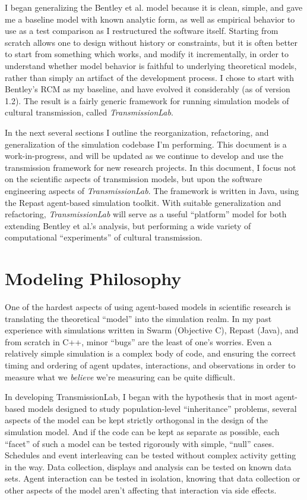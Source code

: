 \documentclass{kluwer-mem-copyright}
\begin{document}
\begin{article}
I began generalizing the Bentley et al. model because it is clean,
simple, and gave me a baseline model with known analytic form, as well as empirical behavior to use as a test comparison as I restructured the software itself.   Starting from scratch allows
one to design without history or constraints, but it is often better to start
from something which works, and modify it incrementally, in order to understand whether model behavior is faithful to underlying theoretical models, rather than simply an artifact of the development process.  I chose to start with Bentley's RCM as my baseline, and have evolved it considerably (as of version 1.2).  The result is a fairly generic framework for running 
simulation models of cultural transmission, called \emph{TransmissionLab}.  

In the next several sections I outline the reorganization, refactoring, and
generalization of the simulation codebase I'm performing.  This document is a work-in-progress, and will be updated as we continue to develop and use the transmission framework for new research projects.  In this document, I focus not on the scientific aspects of transmission models, but upon the software engineering
aspects of \emph{TransmissionLab}.  The framework is written in Java, using the Repast agent-based simulation toolkit.  With suitable generalization and refactoring, \emph{TransmissionLab} will serve as a useful ``platform'' model
for both extending Bentley et al.'s analysis, but performing a wide variety of computational ``experiments'' of cultural transmission. 
 
\section{Modeling Philosophy}
One of the hardest aspects of using agent-based models in scientific research is
translating the theoretical ``model'' into the simulation realm.  In my past experience with simulations
written in Swarm (Objective C), Repast (Java), and from scratch in C++, minor
``bugs'' are the least of one's worries.  Even a relatively simple simulation is a complex body
of code, and ensuring the correct timing and ordering of agent updates,
interactions, and observations in order to measure what we \emph{believe} we're
measuring can be quite difficult.  

In developing TransmissionLab, I began with the hypothesis that 
in most agent-based models designed to study
population-level ``inheritance'' problems, several aspects of the model can be
kept strictly orthogonal in the design of the simulation model.  And if the code
can be kept as separate as possible, each ``facet'' of such a model can be
tested rigorously with simple, ``null'' cases.  Schedules and event interleaving
can be tested without complex activity getting in the way.  Data collection,
displays and analysis can be tested on known data sets.  Agent interaction can
be tested in isolation, knowing that data collection or other aspects of the
model aren't affecting that interaction via side effects.  


\end{article}
\end{document}
